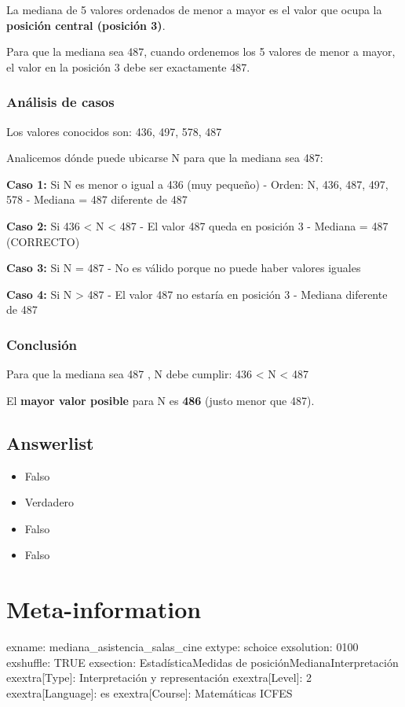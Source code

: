 \documentclass[
]{article}
\providecommand{\tightlist}{%
  \setlength{\itemsep}{0pt}\setlength{\parskip}{0pt}}
\begin{document}
La mediana de 5 valores ordenados de menor a mayor es el valor que ocupa
la \textbf{posición central (posición 3)}.

Para que la mediana sea 487, cuando ordenemos los 5 valores de menor a
mayor, el valor en la posición 3 debe ser exactamente 487.

\subsubsection{Análisis de casos}\label{analisis-casos-992}

Los valores conocidos son: 436, 497, 578, 487

Analicemos dónde puede ubicarse N para que la mediana sea 487:

\hfill\break

\textbf{Caso 1:} Si N es menor o igual a 436 (muy pequeño) - Orden: N,
436, 487, 497, 578 - Mediana = 487 diferente de 487

\textbf{Caso 2:} Si 436 \textless{} N \textless{} 487 - El valor 487
queda en posición 3 - Mediana = 487 (CORRECTO)

\textbf{Caso 3:} Si N = 487 - No es válido porque no puede haber valores
iguales

\textbf{Caso 4:} Si N \textgreater{} 487 - El valor 487 no estaría en
posición 3 - Mediana diferente de 487

\subsubsection{Conclusión}\label{conclusion-9582}

Para que la mediana sea 487 , N debe cumplir: 436 \textless{} N
\textless{} 487

El \textbf{mayor valor posible} para N es \textbf{486} (justo menor que
487).

\subsection{Answerlist}\label{answerlist-1}

\begin{itemize}
\tightlist
\item
  Falso
\item
  Verdadero
\item
  Falso
\item
  Falso
\end{itemize}

\section{Meta-information}\label{meta-information}

exname: mediana\_asistencia\_salas\_cine extype: schoice exsolution:
0100 exshuffle: TRUE exsection: Estadística\textbar Medidas de
posición\textbar Mediana\textbar Interpretación exextra{[}Type{]}:
Interpretación y representación exextra{[}Level{]}: 2
exextra{[}Language{]}: es exextra{[}Course{]}: Matemáticas ICFES
\end{document}
